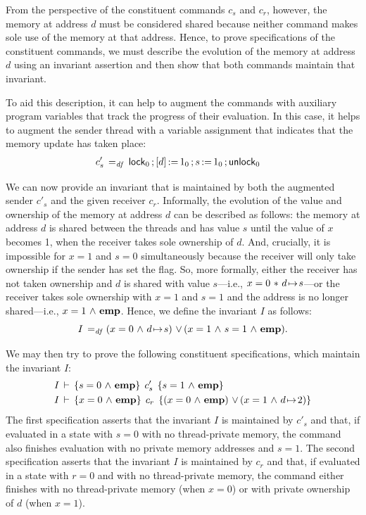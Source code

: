 \documentclass[11pt]{report}
\begin{document}
From the perspective of the constituent commands $c_s$ and $c_r$, however, the memory at address $d$ must be considered shared because neither command makes sole use of the memory at that address. Hence, to prove specifications of the constituent commands, we must describe the evolution of the memory at address $d$ using an invariant assertion and then show that both commands maintain that invariant. 

To aid this description, it can help to augment the commands with auxiliary program variables that track the progress of their evaluation. In this case, it helps to augment the sender thread with a variable assignment that indicates that the memory update has taken place: 
\begin{align*}
c'_s \operatorname{\;=_{\mathit{df}}\;} & \operatorname{\mathsf{lock}}_0 \operatorname{;} \left[ d \right] \operatorname{:\!=} 1_0 \operatorname{;} s \operatorname{:\!=} 1_0 \operatorname{;} \operatorname{\mathsf{unlock}}_0
\end{align*}

We can now provide an invariant that is maintained by both the augmented sender $c'_s$ and the given receiver $c_r$. Informally, the evolution of the value and ownership of the memory at address $d$ can be described as follows: the memory at address $d$ is shared between the threads and has value $s$ until the value of $x$ becomes 1, when the receiver takes sole ownership of $d$. And, crucially, it is impossible for $x = 1$ and $s = 0$ simultaneously because the receiver will only take ownership if the sender has set the flag. So, more formally, either the receiver has not taken ownership and $d$ is shared with value $s$---i.e., $x = 0 \operatorname{\,\ast\,} d \!\mapsto\! s$---or the receiver takes sole ownership with $x = 1$ and $s = 1$ and the address is no longer shared---i.e., $x = 1 \operatorname{\,\wedge\,} \mathbf{emp}$. Hence, we define the invariant $I$ as follows: \[ I \operatorname{\;=_{\mathit{df}}\;} (x = 0 \operatorname{\,\wedge\,} d \!\mapsto\! s) \operatorname{\,\vee\,} (x = 1 \operatorname{\,\wedge\,} s = 1 \operatorname{\,\wedge\,} \mathbf{emp}).\]

We may then try to prove the following constituent specifications, which maintain the invariant $I$: \begin{align*}
  &I\,\vdash\,\left\lbrace s = 0 \operatorname{\,\wedge\,} \mathbf{emp} \right\rbrace\;c'_s\;\left\lbrace s = 1 \operatorname{\,\wedge\,} \mathbf{emp} \right\rbrace \\
  &I\,\vdash\,\left\lbrace x = 0 \operatorname{\,\wedge\,} \mathbf{emp} \right\rbrace\;c_r\;\left\lbrace (x = 0 \operatorname{\,\wedge\,} \mathbf{emp}) \operatorname{\,\vee\,} (x = 1 \operatorname{\,\wedge\,} d \!\mapsto\! 2) \right\rbrace
\end{align*} The first specification asserts that the invariant $I$ is maintained by $c'_s$ and that, if evaluated in a state with $s = 0$ with no thread-private memory, the command also finishes evaluation with no private memory addresses and $s = 1$. The second specification asserts that the invariant $I$ is maintained by $c_r$ and that, if evaluated in a state with $r = 0$ and with no thread-private memory, the command either finishes with no thread-private memory (when $x = 0$) or with private ownership of $d$ (when $x = 1$). 
\end{document}

